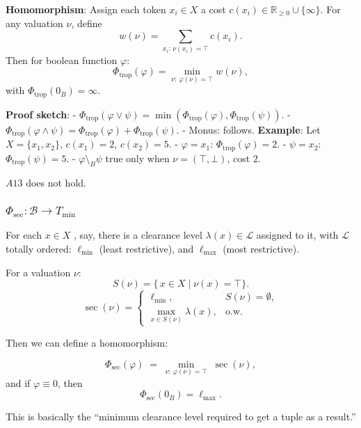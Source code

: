 \textbf{Homomorphism}:\newline
Assign each token \(x_i\in X\) a cost \(c(x_i)\in\mathbb{R}_{\ge0}\cup\{\infty\}\). For any valuation \(\nu\), define
$$
w(\nu) = \sum_{x_i:\,\nu(x_i)=\top} c(x_i).
$$
Then for boolean function  \(\varphi\):
$$
\Phi_{\mathrm{trop}}(\varphi) 
= \min_{\nu:\,\varphi(\nu)=\top} w(\nu),
$$
with \(\Phi_{\mathrm{trop}}(0_B)=\infty\).
\newline

\textbf{Proof sketch}: \newline
- \(\Phi_{\mathrm{trop}}(\varphi \vee \psi) = \min(\Phi_{\mathrm{trop}}(\varphi), \Phi_{\mathrm{trop}}(\psi))\).  
- \(\Phi_{\mathrm{trop}}(\varphi \wedge \psi) = \Phi_{\mathrm{trop}}(\varphi) + \Phi_{\mathrm{trop}}(\psi)\).  
- Monus: follows. \newline
\textbf{Example}: \newline
Let \(X=\{x_1,x_2\}\), \(c(x_1)=2\), \(c(x_2)=5\).  
- \(\varphi = x_1\): \(\Phi_{\mathrm{trop}}(\varphi)=2\).  
- \(\psi = x_2\): \(\Phi_{\mathrm{trop}}(\psi)=5\).  
- \(\varphi \setminus_B \psi\) true only when \(\nu=(\top,\bot)\), cost \(2\).

$A13$ does not hold.


\subsubsection{$\Phi_{\mathrm{sec}}: \mathcal{B} \to T_{\min}$}

For each \(x\in X\) , say, there is a clearance level \(\lambda(x)\in \mathcal L\) assigned to it,
with \(\mathcal L\) totally ordered: \(\ell_{\min}\) (least restrictive),
and \(\ell_{\max}\) (most restrictive).

For a valuation \(\nu\):
\[
S(\nu) = \{\,x\in X \mid \nu(x)=\top\}.
\]
\[
\sec(\nu) =
\begin{cases}
\ell_{\min}, & S(\nu)=\emptyset,\\
\max_{x\in S(\nu)} \lambda(x), & \text{o.w.}
\end{cases}
\]



Then we can define a homomorphism:

\[
\Phi_{\mathrm{sec}}(\varphi)
\;=\;
\min_{\nu:\,\varphi(\nu)=\top}\;\sec(\nu),
\]
and if \(\varphi\equiv 0\), then
\[
\Phi_{\mathrm{sec}}(0_B) = \ell_{\max}.
\]

This is basically the “minimum clearance level required to get a tuple as a result.”




